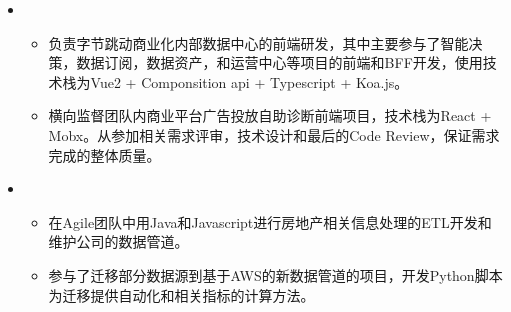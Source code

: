 \documentclass[11pt,a4paper,sans]{moderncv}        %
\begin{document}
\begin{itemize}
\vspace{2pt}

\item{

\begin{itemize}
\item{负责字节跳动商业化内部数据中心的前端研发，其中主要参与了智能决策，数据订阅，数据资产，和运营中心等项目的前端和BFF开发，使用技术栈为Vue2 + Componsition api + Typescript + Koa.js。}
\vspace{2pt}
\item{横向监督团队内商业平台广告投放自助诊断前端项目，技术栈为React + Mobx。从参加相关需求评审，技术设计和最后的Code Review，保证需求完成的整体质量。}

\end{itemize}}
\vspace{1em}

\item{

\begin{itemize}
\item{在Agile团队中用Java和Javascript进行房地产相关信息处理的ETL开发和维护公司的数据管道。}
\vspace{2pt}
\item{参与了迁移部分数据源到基于AWS的新数据管道的项目，开发Python脚本为迁移提供自动化和相关指标的计算方法。}

\end{itemize}}
\end{itemize}
\end{document}
